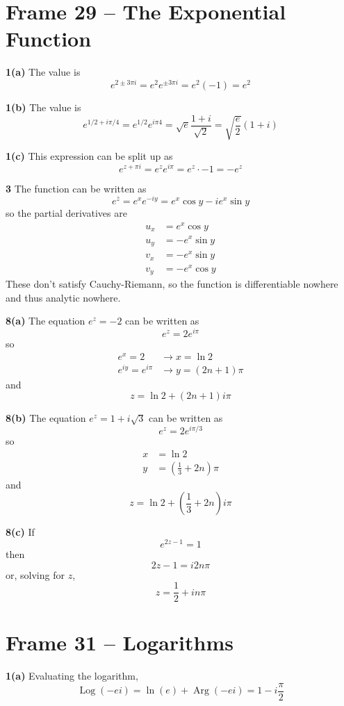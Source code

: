 \documentclass{article}
\renewcommand{\bar}{\overline}
\DeclareMathOperator{\Log}{Log}
\DeclareMathOperator{\Arg}{Arg}
\begin{document}
\section{Frame 29 -- The Exponential Function}
\textbf{1(a)}
The value is
\[
	e^{2 \pm 3\pi i} 
	= e^2 e^{\pm 3\pi i}
	= e^2 (-1)
	= e^2
\]

\textbf{1(b)}
The value is
\[
	e^{1/2 + i \pi/4}
	= e^{1/2} e^{i \pi 4}
	= \sqrt{e} \frac{1 + i}{\sqrt{2}}
	= \sqrt{\frac{e}{2}} (1 + i)
\]

\textbf{1(c)}
This expression can be split up as
\[
	e^{z + \pi i}
	= e^z e^{i \pi}
	= e^z \cdot -1
	= -e^z
\]

\textbf{3}
The function can be written as
\[
	e^{\bar{z}}
	= e^{x} e^{-iy}
	= e^x \cos y - i e^x \sin y
\]
so the partial derivatives are
\begin{align*}
	u_x &=  e^x \cos y \\
	u_y &= -e^x \sin y \\
	v_x &= -e^x \sin y \\
	v_y &= -e^x \cos y
\end{align*}
These don't satisfy Cauchy-Riemann, so the function is differentiable nowhere and thus analytic nowhere.

\textbf{8(a)}
The equation $e^z = -2$ can be written as
\[
	e^z = 2e^{i\pi}
\]
so
\begin{align*}
	e^x = 2				&\to x = \ln 2 \\
	e^{iy} = e^{i\pi}	&\to y = (2n + 1) \pi
\end{align*}
and
\[
	z = \ln 2 + (2n + 1) i\pi
\]

\textbf{8(b)}
The equation $e^z = 1 + i\sqrt{3}$ can be written as
\[
	e^z = 2 e^{i \pi/3}
\]
so
\begin{align*}
	x &= \ln 2 \\
	y &= \left( \frac{1}{3} + 2n \right) \pi
\end{align*}
and
\[
	z = \ln 2 + \left( \frac{1}{3} + 2n \right) i \pi
\]

\textbf{8(c)}
If
\[
	e^{2z - 1} = 1
\]
then
\[
	2z - 1 = i2n\pi
\]
or, solving for $z$,
\[
	z = \frac{1}{2} + i n\pi
\]



\clearpage
\section{Frame 31 -- Logarithms}
\textbf{1(a)}
Evaluating the logarithm,
\[
	\Log(-ei) = \ln(e) + \Arg(-ei) = 1 - i\frac{\pi}{2}
\]
\end{document}
